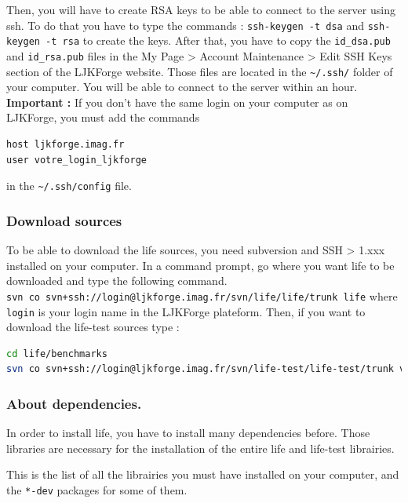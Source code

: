 \documentclass[11pt]{article}
\begin{document}
Then, you will have to create RSA keys to be able to connect to the server
using ssh. To do that you have to type the commands :
\verb|ssh-keygen -t dsa| and \linebreak[2] \verb|ssh-keygen -t rsa| to create
the keys. After that, you have to copy the \verb|id_dsa.pub| and
\verb|id_rsa.pub| files in the My Page > Account Maintenance > Edit SSH Keys
section of the LJKForge website. Those files are located in the \verb|~/.ssh/|
folder of your computer. You will be able to connect to the server within an
hour.
\\
{\bfseries Important : } If you don't have the same login on your computer as on
LJKForge, you must add the commands
\begin{lstlisting}[language=sh]
host ljkforge.imag.fr
user votre_login_ljkforge
\end{lstlisting}
in the \verb|~/.ssh/config| file.

\subsubsection{Download sources}
To be able to download the life sources, you need subversion and SSH > 1.xxx
installed on your computer. In a command prompt, go where you want life to be
downloaded and type the following command.
\\ \verb|svn co svn+ssh://login@ljkforge.imag.fr/svn/life/life/trunk life|
where \\ \verb|login| is your login name in the LJKForge plateform. Then, if
you want to download the life-test sources type :
\begin{lstlisting}[language=sh]
cd life/benchmarks
svn co svn+ssh://login@ljkforge.imag.fr/svn/life-test/life-test/trunk validation
\end{lstlisting}

\subsubsection{About dependencies.}
In order to install life, you have to install many dependencies before. Those
libraries are necessary for the installation of the entire life and life-test
librairies.

This is the list of all the librairies you must have installed on your
computer, and the \verb|*-dev| packages for some of them.
\end{document}
